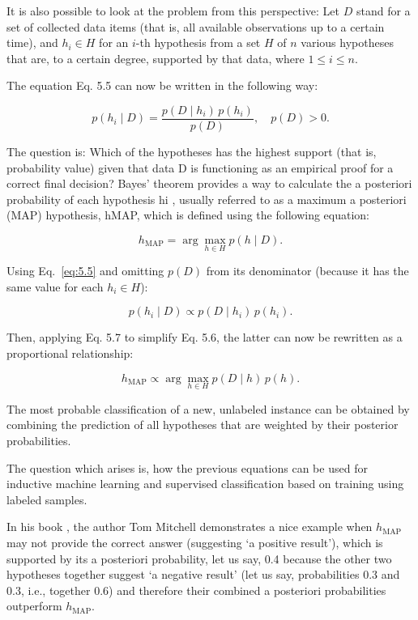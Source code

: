 It is also possible to look at the problem from this perspective: Let $D$ stand
for a set of collected data items (that is, all available observations up to a certain
time), and $h_i \in H$ for an $i$-th hypothesis from a set $H$ of $n$ various hypotheses that
are, to a certain degree, supported by that data, where $1 \le i \le n$.

The equation Eq. 5.5 can now be written in the following way:

\begin{equation}
p(h_i \mid D) = \frac{p(D \mid h_i) \, p(h_i)}{p(D)}, \quad p(D) > 0. \label{eq:5.5}
\end{equation}

The question is: Which of the hypotheses has the highest support (that is,
probability value) given that data D is functioning as an empirical proof for a correct final decision? Bayes’ theorem provides a way to calculate the a posteriori
probability of each hypothesis hi
, usually referred to as a maximum a posteriori
(MAP) hypothesis, hMAP, which is defined using the following equation:

\begin{equation}
h_{\text{MAP}} = \arg\max_{h \in H} p(h \mid D). \label{eq:5.6}
\end{equation}

Using Eq.~\eqref{eq:5.5} and omitting $p(D)$ from its denominator (because it has the
same value for each $h_i \in H$):

\begin{equation}
p(h_i \mid D) \propto p(D \mid h_i) \, p(h_i). \label{eq:5.7}
\end{equation}

Then, applying Eq. 5.7 to simplify Eq. 5.6, the latter can now be rewritten as
a proportional relationship:

\begin{equation}
h_{\text{MAP}} \propto \arg\max_{h \in H} p(D \mid h) \, p(h). \label{eq:5.8}
\end{equation}

The most probable classification of a new, unlabeled instance can be obtained
by combining the prediction of all hypotheses that are weighted by their posterior
probabilities.

The question which arises is, how the previous equations can be used for
inductive machine learning and supervised classification based on training using
labeled samples.

In his book \cite{ref199}, the author Tom Mitchell demonstrates a nice example when 
$h_{\text{MAP}}$ may not provide the correct answer (suggesting ‘a positive result’), which
is supported by its a posteriori probability, let us say, 0.4 because the other two hypotheses together suggest ‘a negative result’ (let us say, probabilities 0.3 and 0.3,
i.e., together 0.6) and therefore their combined a posteriori probabilities outperform $h_{\text{MAP}}$.

